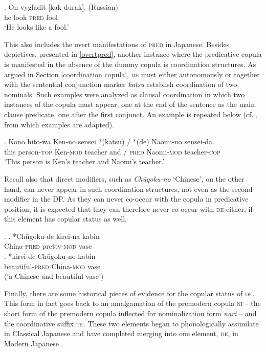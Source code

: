 \exg. On vygladit [kak durak]. (Russian)\\
he look \textsc{pred} fool\\
`He looks like a fool.’ \null\ \hfill \citep[39]{bailyn:2002:overt} \label{predrussian}

This also includes the overt manifestations of \textsc{pred} in Japanese. Besides depictives, presented in \ref{overtpred}, another instance where the predicative copula is manifested in the absence of the dummy copula is coordination structures. As argued in Section \ref{coordination copula}, \textsc{de} must either autonomously or together with the sentential conjunction marker \textit{katsu} establish coordination of two nominals. Such examples were analyzed as clausal coordination in which two instances of the copula must appear, one at the end of the sentence as the main clause predicate, one after the first conjunct. An example is repeated below (cf. \citealt[364]{hiraiwa:2012:mechanism}, from which examples are adapted). 

\exg. Kono hito-wa Ken-no sensei *(katsu) / *(de) Naomi-no sensei-da.\\
this person-\textsc{top} Ken-\textsc{mod} teacher and / \textsc{pred} Naomi-\textsc{mod} teacher-\textsc{cop}\\
`This person is Ken's teacher and Naomi's teacher.’

Recall also that direct modifiers, such as \textit{Chūgoku-no} `Chinese’, on the other hand, can never appear in such coordination structures, not even as the second modifier in the DP. As they can never co-occur with the copula in predicative position, it is expected that they can therefore never co-occur with \textsc{de} either, if this element has copular status as well.

\ex. \ag. *Chūgoku-de kirei-na kabin\\
China-\textsc{pred} pretty-\textsc{mod} vase\\
\bg. *kirei-de Chūgoku-no 	kabin\\
beautiful-\textsc{pred} China-\textsc{mod} vase\\
(`a Chinese and beautiful vase’)


Finally, there are some historical pieces of evidence for the copular status of \textsc{de}. This form in fact goes back to an amalgamation of the premodern copula \textsc{ni} -- the short form of the premodern copula inflected for nominalization form \textit{nari} -- and the coordinative suffix \textsc{te}. These two elements began to phonologically assimilate in Classical Japanese and have completed merging into one element, \textsc{de}, in Modern Japanese \citep{frellesvig:2010:history, miyama:2011:da}.  

